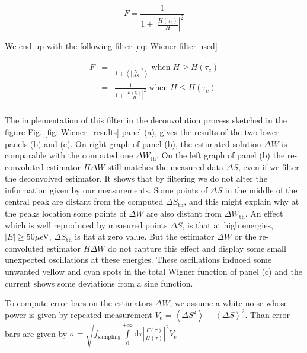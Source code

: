\begin{equation}
	F = \frac{1}{1+\left|\frac{H(\tau_{c})}{H}\right|^{2}} \label{eq: Wiener filter use for low SNR}
\end{equation}

We end up with the following filter \eqref{eq: Wiener filter used}

\begin{eqnarray}
	F &=& \frac{1}{1+\left<\left|\frac{N}{\Delta S}\right|^{2}\right>}\; \mathrm{when}\; H \geq H(\tau_{c}) \\
	&=& \frac{1}{1+\left|\frac{H(\tau_{c})}{H}\right|^{2}}\; \mathrm{when}\; H \leq H(\tau_{c}) \\ \label{eq: Wiener filter used}
\end{eqnarray}

The implementation of this filter in the deconvolution process sketched in the figure Fig. \ref{fig: Wiener_results} panel (a), gives the results of the two lower panels (b) and (c). On right graph of panel (b), the estimated solution $\Delta W$ is comparable with the computed one $\Delta W_{\mathrm{th}}$. On the left graph of panel (b) the re-convoluted estimator $H\Delta W$ still matches the measured data $\Delta S$, even if we filter the deconvolved estimator. It shows that by filtering we do not alter the information given by our measurements. Some points of $\Delta S$ in the middle of the central peak are distant from the computed $\Delta S_{\mathrm{th}}$, and this might explain why at the peaks location some points of $\Delta W$ are also distant from $\Delta W_{\mathrm{th}}$. An effect which is well reproduced by measured points $\Delta S$, is that at high energies, $\left|E\right|\geq 50 \mu$eV, $\Delta S_{\mathrm{th}}$ is flat at zero value. But the estimator $\Delta W$ or the re-convoluted estimator $H\Delta W$ do not capture this effect and display some small unexpected oscillations at these energies. These oscillations induced some unwanted yellow and cyan spots in the total Wigner function of panel (c) and the current shows some deviations from a sine function.

To compute error bars on the estimators $\Delta W$, we assume a white noise whose power is given by repeated measurement $V_{e}=\left<\Delta S^{2}\right>-\left<\Delta S\right>^{2}$. Than error bars are given by $\sigma = \sqrt{f_{\mathrm{sampling}}\int\limits_{0}^{+\infty}\mathrm{d}\tau \left|\frac{F\left(\tau\right)}{H\left(\tau\right)}\right|^{2}V_{e}}$

